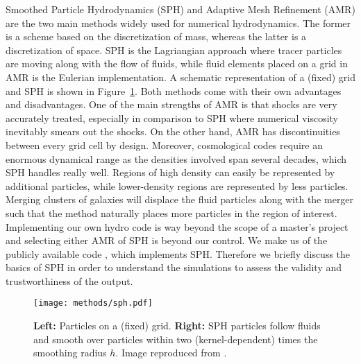\documentclass[MScProj_TLRH_ClusterEnergy.tex]{subfiles}
\begin{document}
Smoothed Particle Hydrodynamics (SPH) and Adaptive Mesh Refinement (AMR) are the
two main methods widely used for numerical hydrodynamics. The former is a scheme 
based on the discretization of mass, whereas the latter is a discretization of 
space. SPH is the Lagriangian approach where tracer particles are moving along
with the flow of fluids, while fluid elements placed on a grid in AMR is the 
Eulerian implementation. A schematic representation of a (fixed) grid and SPH is 
shown in Figure~\ref{fig:amr_vs_sph}. Both methods come with their own advantages and 
disadvantages. One of the main strengths of AMR is that shocks are very accurately
treated, especially in comparison to SPH where numerical viscosity inevitably 
smears out the shocks. On the other hand, AMR has discontinuities between every grid 
cell by design. Moreover, cosmological codes require an enormous dynamical range
as the densities involved span several decades, which SPH handles really well. 
Regions of high density can easily be represented by additional particles, 
while lower-density regions are represented by less particles. Merging clusters 
of galaxies will displace the fluid particles along with the merger such that
the method naturally places more particles in the region of interest. Implementing 
our own hydro code is way beyond the scope of a master's project and selecting
either AMR of SPH is beyond our control. We make us of the publicly available
code , which implements SPH. Therefore we briefly discuss the
basics of SPH in order to understand the simulations to assess the validity and
trustworthiness of the output.

\begin{figure}
    \centering
    \texttt{[image: methods/sph.pdf]}
    \caption{\textbf{Left:} Particles on a (fixed) grid. \textbf{Right:} SPH 
             particles follow fluids and smooth over particles within
             two (kernel-dependent) times the smoothing radius $h$. Image reproduced from 
             \citet{Price2012759}.}
    \label{fig:amr_vs_sph}
\end{figure}
\end{document}
